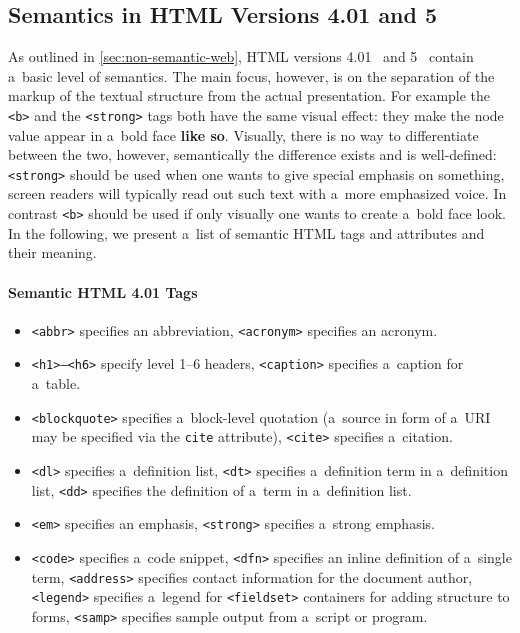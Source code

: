 \subsection{Semantics in HTML Versions 4.01 and 5}

As outlined in \autoref{sec:non-semantic-web},
HTML versions 4.01~\cite{raggett1999html}
and 5~\cite{berjon2012html5}
contain a~basic level of semantics.
The main focus, however, is on the separation of
the markup of the textual structure from the actual presentation.
For example the \texttt{<b>} and the \texttt{<strong>} tags
both have the same visual effect:
they make the node value appear in a~bold face \textbf{like so}.
Visually, there is no way to differentiate between the two,
however, semantically the difference exists and is well-defined:
\texttt{<strong>} should be used when
one wants to give special emphasis on something,
screen readers will typically read out such text
with a~more emphasized voice.
In contrast \texttt{<b>} should be used
if only visually one wants to create a~bold face look.
In the following, we present a~list of semantic HTML tags
and attributes and their meaning.

\paragraph{Semantic HTML 4.01 Tags}

\begin{itemize}
  \item \texttt{<abbr>} specifies an abbreviation,
        \texttt{<acronym>} specifies an acronym.
  \item \texttt{<h1>--<h6>} specify level 1--6 headers,
        \texttt{<caption>} specifies a~caption for a~table.
  \item \texttt{<blockquote>} specifies a~block-level quotation
        (a~source in form of a~URI may be specified via the
        \texttt{cite} attribute),
        \texttt{<cite>} specifies a~citation.
  \item \texttt{<dl>} specifies a~definition list, \texttt{<dt>}
        specifies a~definition term in a~definition list,
        \texttt{<dd>} specifies the definition of a~term
        in a~definition list.
  \item \texttt{<em>} specifies an emphasis, \texttt{<strong>}
        specifies a~strong emphasis.
  \item \texttt{<code>} specifies a~code snippet, \texttt{<dfn>}
        specifies an inline definition of a~single term,
        \texttt{<address>} specifies contact information
        for the document author, \texttt{<legend>} specifies
        a~legend for \texttt{<fieldset>} containers
        for adding structure to forms,
        \texttt{<samp>} specifies sample output
        from a~script or program.
\end{itemize}

